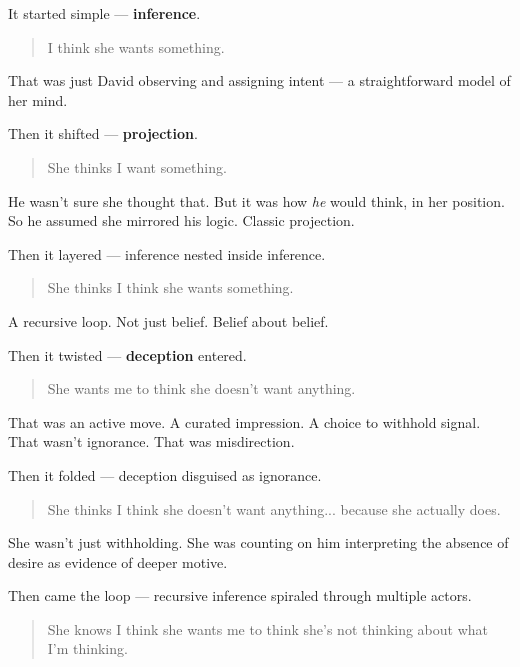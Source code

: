 \medskip


It started simple — \textbf{inference}.

\begin{quote}
I think she wants something.
\end{quote}

That was just David observing and assigning intent — a straightforward model of her mind.

\medskip

Then it shifted — \textbf{projection}.

\begin{quote}
    She thinks I want something.
\end{quote}

He wasn’t sure she thought that. But it was how \emph{he} would think, in her position. So he assumed she mirrored his logic. Classic projection.

\medskip

Then it layered — inference nested inside inference.

\begin{quote}
She thinks I think she wants something.
\end{quote}

A recursive loop. Not just belief. Belief about belief.

Then it twisted — \textbf{deception} entered.

\begin{quote}
She wants me to think she doesn’t want anything.
\end{quote}

That was an active move. A curated impression. A choice to withhold signal. That wasn’t ignorance. That was misdirection.

Then it folded — deception disguised as ignorance.

\begin{quote}
She thinks I think she doesn’t want anything... because she actually does.
\end{quote}

She wasn’t just withholding. She was counting on him interpreting the absence of desire as evidence of deeper motive.

Then came the loop — recursive inference spiraled through multiple actors.

\begin{quote}
She knows I think she wants me to think she’s not thinking about what I’m thinking.
\end{quote}

